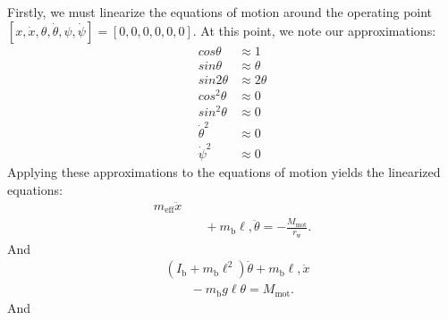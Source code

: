 \documentclass[journal]{IEEEtran}
\begin{document}
Firstly, we must linearize the equations of motion around the operating point 
$[x, \dot{x}, \theta, \dot{\theta}, \psi, \dot{\psi}] = [0, 0, 0, 0, 0, 0]$. At this point, we note our approximations:
\begin{align}
cos\theta &\approx 1 \\
sin\theta &\approx \theta \\
sin2\theta &\approx 2\theta \\
cos^{2}\theta &\approx 0 \\
sin^{2}\theta &\approx 0 \\
\dot{\theta}^2 &\approx 0 \\
\dot{\psi}^2 &\approx 0
\end{align}
Applying these approximations to the equations of motion yields the linearized equations:
\begin{align}
    m_{\mathrm{eff}}
    \ddot{x}
    \nonumber\\
    &\quad
    +
    m_{\mathrm b}\ell,\ddot{\theta}
    =
    -\frac{M_{\mathrm{mot}}}{r_{\mathrm w}}.
    \label{eq:translation_eom_linearized}
\end{align}
And
\begin{align}
    &\left(
        I_{\mathrm b}
        +
        m_{\mathrm b}\ell^2
    \right)
    \ddot{\theta}
    +
    m_{\mathrm b}\ell,\ddot{x}
    \nonumber\\
    &\qquad
    -
    m_{\mathrm b}g\ell\theta
    =
    M_{\mathrm{mot}}.
    \label{eq:angular_eom_linearized}
\end{align}
And
\end{document}
